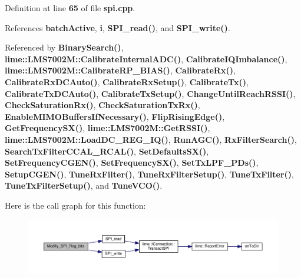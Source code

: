 Definition at line {\bf 65} of file {\bf spi.\+cpp}.



References {\bf batch\+Active}, {\bf i}, {\bf S\+P\+I\+\_\+read()}, and {\bf S\+P\+I\+\_\+write()}.



Referenced by {\bf Binary\+Search()}, {\bf lime\+::\+L\+M\+S7002\+M\+::\+Calibrate\+Internal\+A\+D\+C()}, {\bf Calibrate\+I\+Q\+Imbalance()}, {\bf lime\+::\+L\+M\+S7002\+M\+::\+Calibrate\+R\+P\+\_\+\+B\+I\+A\+S()}, {\bf Calibrate\+Rx()}, {\bf Calibrate\+Rx\+D\+C\+Auto()}, {\bf Calibrate\+Rx\+Setup()}, {\bf Calibrate\+Tx()}, {\bf Calibrate\+Tx\+D\+C\+Auto()}, {\bf Calibrate\+Tx\+Setup()}, {\bf Change\+Until\+Reach\+R\+S\+S\+I()}, {\bf Check\+Saturation\+Rx()}, {\bf Check\+Saturation\+Tx\+Rx()}, {\bf Enable\+M\+I\+M\+O\+Buffers\+If\+Necessary()}, {\bf Flip\+Rising\+Edge()}, {\bf Get\+Frequency\+S\+X()}, {\bf lime\+::\+L\+M\+S7002\+M\+::\+Get\+R\+S\+S\+I()}, {\bf lime\+::\+L\+M\+S7002\+M\+::\+Load\+D\+C\+\_\+\+R\+E\+G\+\_\+\+I\+Q()}, {\bf Run\+A\+G\+C()}, {\bf Rx\+Filter\+Search()}, {\bf Search\+Tx\+Filter\+C\+C\+A\+L\+\_\+\+R\+C\+A\+L()}, {\bf Set\+Defaults\+S\+X()}, {\bf Set\+Frequency\+C\+G\+E\+N()}, {\bf Set\+Frequency\+S\+X()}, {\bf Set\+Tx\+L\+P\+F\+\_\+\+P\+Ds()}, {\bf Setup\+C\+G\+E\+N()}, {\bf Tune\+Rx\+Filter()}, {\bf Tune\+Rx\+Filter\+Setup()}, {\bf Tune\+Tx\+Filter()}, {\bf Tune\+Tx\+Filter\+Setup()}, and {\bf Tune\+V\+C\+O()}.



Here is the call graph for this function\+:
\nopagebreak
\begin{figure}[H]
\begin{center}
\leavevmode
\includegraphics[width=350pt]{da/d87/spi_8h_aaf76507507e6a960fa0c8cb26585095d_cgraph}
\end{center}
\end{figure}




